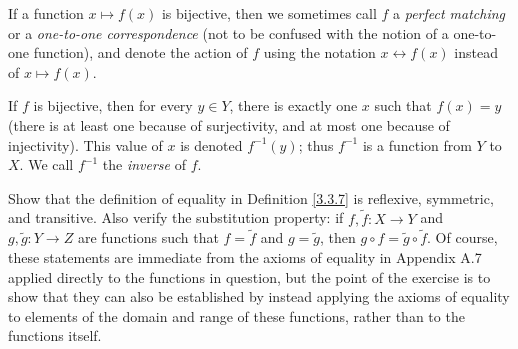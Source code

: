 \setcounter{theorem}{22}
\begin{remark}\label{3.3.23}
If a function \(x \mapsto f(x)\) is bijective, then we sometimes call \(f\) a \emph{perfect matching} or a \emph{one-to-one correspondence} (not to be confused with the notion of a one-to-one function), and denote the action of \(f\) using the notation \(x \leftrightarrow f(x)\) instead of \(x \mapsto f(x)\).
\end{remark}

If \(f\) is bijective, then for every \(y \in Y\), there is exactly one \(x\) such that \(f(x) = y\) (there is at least one because of surjectivity, and at most one because of injectivity).
This value of \(x\) is denoted \(f^{-1}(y)\); thus \(f^{-1}\) is a function from \(Y\) to \(X\).
We call \(f^{-1}\) the \emph{inverse} of \(f\).

\exercisesection

\begin{exercise}\label{ex 3.3.1}
Show that the definition of equality in Definition \ref{3.3.7} is reflexive, symmetric, and transitive.
Also verify the substitution property: if \(f, \tilde{f} : X \to Y\) and \(g, \tilde{g} : Y \to Z\) are functions such that \(f = \tilde{f}\) and \(g = \tilde{g}\), then \(g \circ f = \tilde{g} \circ \tilde{f}\).
Of course, these statements are immediate from the axioms of equality in Appendix A.7 applied directly to the functions in question, but the point of the exercise is to show that they can also be established by instead applying the axioms of equality to elements of the domain and range of these functions, rather than to the functions itself.
\end{exercise}

